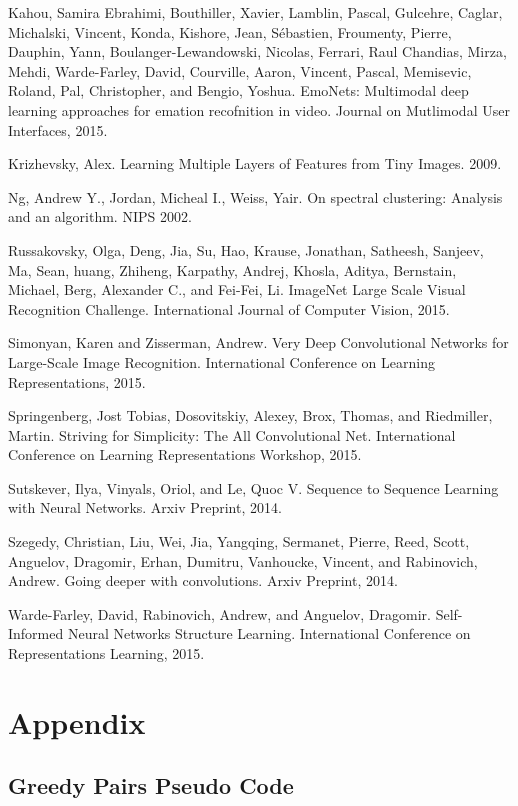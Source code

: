 \documentclass[12pt]{article}
\begin{document}
Kahou, Samira Ebrahimi, Bouthiller, Xavier, Lamblin, Pascal, Gulcehre,
Caglar, Michalski, Vincent, Konda, Kishore, Jean, Sébastien, Froumenty,
Pierre, Dauphin, Yann, Boulanger-Lewandowski, Nicolas, Ferrari, Raul
Chandias, Mirza, Mehdi, Warde-Farley, David, Courville, Aaron, Vincent,
Pascal, Memisevic, Roland, Pal, Christopher, and Bengio, Yoshua.
EmoNets: Multimodal deep learning approaches for emation recofnition in
video. Journal on Mutlimodal User Interfaces, 2015.

Krizhevsky, Alex. Learning Multiple Layers of Features from Tiny Images.
2009.

Ng, Andrew Y., Jordan, Micheal I., Weiss, Yair. On spectral clustering:
Analysis and an algorithm. NIPS 2002.

Russakovsky, Olga, Deng, Jia, Su, Hao, Krause, Jonathan, Satheesh,
Sanjeev, Ma, Sean, huang, Zhiheng, Karpathy, Andrej, Khosla, Aditya,
Bernstain, Michael, Berg, Alexander C., and Fei-Fei, Li. ImageNet Large
Scale Visual Recognition Challenge. International Journal of Computer
Vision, 2015.

Simonyan, Karen and Zisserman, Andrew. Very Deep Convolutional Networks
for Large-Scale Image Recognition. International Conference on Learning
Representations, 2015.

Springenberg, Jost Tobias, Dosovitskiy, Alexey, Brox, Thomas, and
Riedmiller, Martin. Striving for Simplicity: The All Convolutional Net.
International Conference on Learning Representations Workshop, 2015.

Sutskever, Ilya, Vinyals, Oriol, and Le, Quoc V. Sequence to Sequence
Learning with Neural Networks. Arxiv Preprint, 2014.

Szegedy, Christian, Liu, Wei, Jia, Yangqing, Sermanet, Pierre, Reed,
Scott, Anguelov, Dragomir, Erhan, Dumitru, Vanhoucke, Vincent, and
Rabinovich, Andrew. Going deeper with convolutions. Arxiv Preprint,
2014.

Warde-Farley, David, Rabinovich, Andrew, and Anguelov, Dragomir.
Self-Informed Neural Networks Structure Learning. International
Conference on Representations Learning, 2015.

\section{Appendix}\label{appendix}

\subsection{Greedy Pairs Pseudo Code}\label{greedy-pairs-pseudo-code}
\end{document}
